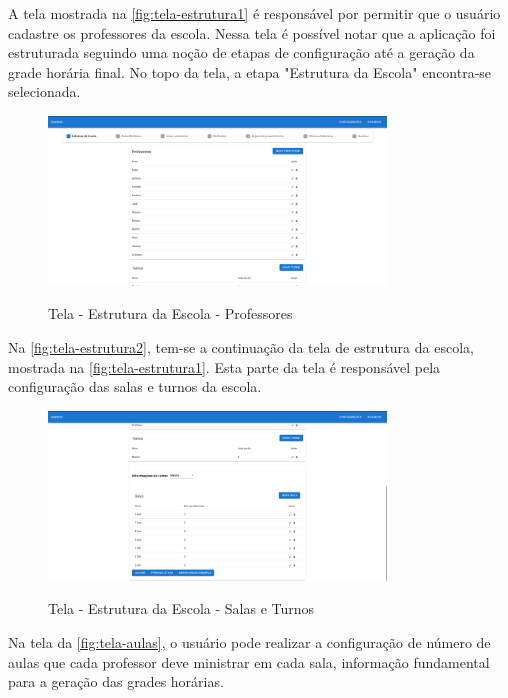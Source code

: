 A tela mostrada na \autoref{fig:tela-estrutura1} é responsável por permitir que o usuário cadastre os professores da escola. Nessa tela é possível notar que a aplicação foi estruturada seguindo uma noção de etapas de configuração até a geração da grade horária final. No topo da tela, a etapa "Estrutura da Escola" encontra-se selecionada.

\begin{figure}[!htb]
	\centering
	\caption{Tela - Estrutura da Escola - Professores}
	\includegraphics[width=0.8\textwidth]{./dados/figuras/tela_estrutura1}
	\label{fig:tela-estrutura1}
\end{figure}
\newpage

Na \autoref{fig:tela-estrutura2}, tem-se a continuação da tela de estrutura da escola, mostrada na \autoref{fig:tela-estrutura1}. Esta parte da tela é responsável pela configuração das salas e turnos da escola.

\begin{figure}[!htb]
	\centering
	\caption{Tela - Estrutura da Escola - Salas e Turnos}
	\includegraphics[width=0.8\textwidth]{./dados/figuras/tela_estrutura2}
	\label{fig:tela-estrutura2}
\end{figure}

Na tela da \autoref{fig:tela-aulas}, o usuário pode realizar a configuração de número de aulas que cada professor deve ministrar em cada sala, informação fundamental para a geração das grades horárias.

